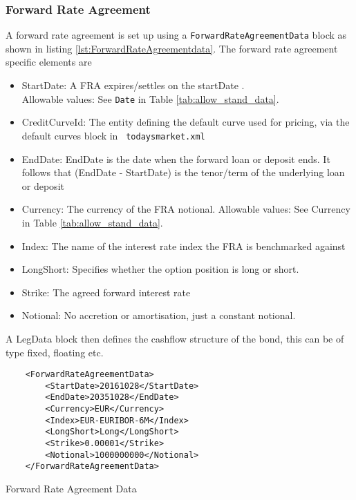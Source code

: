 \subsubsection{Forward Rate Agreement}

A forward rate agreement is set up using a {\tt ForwardRateAgreementData} block as shown in listing \ref{lst:ForwardRateAgreementdata}. The forward rate agreement specific elements
are

\begin{itemize}
\item StartDate: A FRA expires/settles on the startDate . \\ Allowable values:  See \lstinline!Date! in Table \ref{tab:allow_stand_data}.\item CreditCurveId: The entity defining the default curve used for pricing, via the default curves block in {\tt
    todaysmarket.xml}
\item EndDate: EndDate is the date when the forward loan or deposit ends. It follows that (EndDate - StartDate) is the tenor/term of the underlying loan or deposit
\item Currency: The currency of the FRA notional.  	
	Allowable values:  See Currency in Table \ref{tab:allow_stand_data}.	
\item Index: The name of the interest rate index the FRA is benchmarked against
\item LongShort: Specifies whether the option position is long  or
  short.
\item Strike: The agreed forward interest rate
\item Notional: No accretion or amortisation, just a constant notional.
\end{itemize}

A LegData block then defines the cashflow structure of the bond, this can be of type fixed, floating etc.

\begin{listing}[H]
\begin{verbatim}
    <ForwardRateAgreementData>
        <StartDate>20161028</StartDate>
        <EndDate>20351028</EndDate>
        <Currency>EUR</Currency>
        <Index>EUR-EURIBOR-6M</Index>
        <LongShort>Long</LongShort>
        <Strike>0.00001</Strike>
        <Notional>1000000000</Notional>
    </ForwardRateAgreementData>
\end{verbatim}
\caption{Forward Rate Agreement Data}
\label{lst:ForwardRateAgreementdata}
\end{listing}

